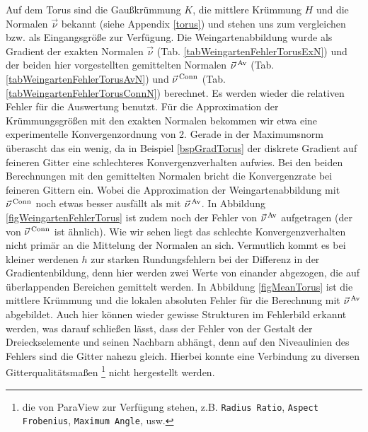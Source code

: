     \begin{beispiel}[Torus]
    \label{bspWeinTorus}
      Auf dem Torus sind die Gaußkrümmung \( K \), die mittlere Krümmung \( H \) und die Normalen \( \vec{\nu} \) bekannt (siehe Appendix
      \ref{torus}) und stehen uns zum vergleichen bzw. als Eingangsgröße zur Verfügung.
      Die Weingartenabbildung wurde als Gradient der exakten Normalen \( \vec{\nu} \) (Tab. \ref{tabWeingartenFehlerTorusExN})
      und der beiden hier vorgestellten gemittelten Normalen 
      \( \vec{\nu}^{\,\text{Av}} \) (Tab. \ref{tabWeingartenFehlerTorusAvN}) und 
      \( \vec{\nu}^{\,\text{Conn}} \) (Tab. \ref{tabWeingartenFehlerTorusConnN}) berechnet.
      Es werden wieder die relativen Fehler für die Auswertung benutzt.
      Für die Approximation der Krümmungsgrößen mit den exakten Normalen bekommen wir etwa eine experimentelle Konvergenzordnung von 2.
      Gerade in der Maximumsnorm überascht das ein wenig, da in Beispiel \ref{bspGradTorus} der diskrete Gradient auf feineren Gitter eine
      schlechteres Konvergenzverhalten aufwies.
      Bei den beiden Berechnungen mit den gemittelten Normalen bricht die Konvergenzrate bei feineren Gittern ein. 
      Wobei die Approximation der Weingartenabbildung mit \( \vec{\nu}^{\,\text{Conn}} \) noch etwas besser ausfällt als mit \(
      \vec{\nu}^{\,\text{Av}} \).
      In Abbildung \ref{figWeingartenFehlerTorus} ist zudem noch der Fehler von \( \vec{\nu}^{\,\text{Av}} \) aufgetragen 
      (der von \( \vec{\nu}^{\,\text{Conn}} \) ist ähnlich).
      Wie wir sehen liegt das schlechte Konvergenzverhalten nicht primär an die Mittelung der Normalen an sich.
      Vermutlich kommt es bei kleiner werdenen \( h \) zur starken Rundungsfehlern bei der Differenz in der Gradientenbildung, denn
      hier werden zwei Werte von einander abgezogen, die auf überlappenden Bereichen gemittelt werden. 
      In Abbildung \ref{figMeanTorus} ist die mittlere Krümmung und die lokalen absoluten Fehler für die Berechnung mit \(
      \vec{\nu}^{\,\text{Av}} \) abgebildet.
      Auch hier können wieder gewisse Strukturen im Fehlerbild erkannt werden, was darauf schließen lässt, dass der Fehler von der Gestalt
      der Dreieckselemente und seinen Nachbarn abhängt, denn auf den Niveaulinien des Fehlers sind die Gitter nahezu gleich.
      Hierbei konnte eine Verbindung zu diversen Gitterqualitätsmaßen
      \footnote{die von ParaView zur Verfügung stehen, z.B. \texttt{Radius Ratio}, \texttt{Aspect Frobenius}, \texttt{Maximum Angle}, usw.}
      nicht hergestellt werden.
      \begin{table}[htbp]
      \footnotesize

\end{table}
\end{beispiel}
